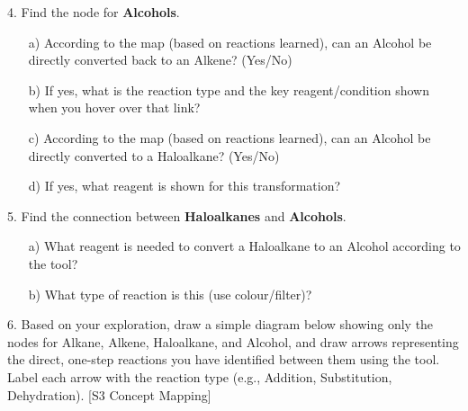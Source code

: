 \documentclass[11pt, a4paper]{article}
\begin{document}
4.  Find the node for \textbf{Alcohols}.
    \begin{itemize}
        \item[a)] According to the map (based on reactions learned), can an Alcohol be directly converted back to an Alkene? (Yes/No)
        \item[b)] If yes, what is the reaction type and the key reagent/condition shown when you hover over that link?
        \vspace{1cm}
        \item[c)] According to the map (based on reactions learned), can an Alcohol be directly converted to a Haloalkane? (Yes/No)
        \item[d)] If yes, what reagent is shown for this transformation?
        \vspace{1cm}
    \end{itemize}

5.  Find the connection between \textbf{Haloalkanes} and \textbf{Alcohols}.
    \begin{itemize}
        \item[a)] What reagent is needed to convert a Haloalkane to an Alcohol according to the tool?
        \vspace{0.5cm}
        \item[b)] What type of reaction is this (use colour/filter)?
        \vspace{0.5cm}
    \end{itemize}

6.  Based on your exploration, draw a simple diagram below showing only the nodes for Alkane, Alkene, Haloalkane, and Alcohol, and draw arrows representing the direct, one-step reactions you have identified between them using the tool. Label each arrow with the reaction type (e.g., Addition, Substitution, Dehydration). [S3 Concept Mapping]
    \vspace{5cm}
\end{document}

